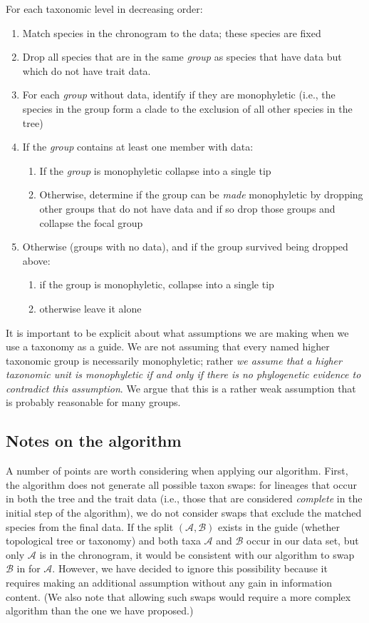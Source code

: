 \documentclass[a4paper,11pt]{article}
\begin{document}
For each taxonomic level in decreasing order:
\begin{enumerate}
  \item Match species in the chronogram to the data; these species are fixed
  \item Drop all species that are in the same \emph{group} as species that have data but which do not have trait data.
  \item For each \emph{group} without data, identify if they are monophyletic (i.e., the species in the group form a clade to the exclusion of all other species in the tree)
  \item If the \emph{group} contains at least one member with data:
    \begin{enumerate}
    \item If the \emph{group} is monophyletic collapse into a single tip
    \item Otherwise, determine if the group can be \emph{made} monophyletic by dropping other groups that do not have data and if so drop those groups and collapse the focal group
    \end{enumerate}
  \item Otherwise (groups with no data), and if the group survived being dropped above:
    \begin{enumerate}
    \item if the group is monophyletic, collapse into a single tip
    \item otherwise leave it alone
    \end{enumerate}
\end{enumerate}

It is important to be explicit about what assumptions we are making when we use a taxonomy as a guide. We are not assuming that every named higher taxonomic group is necessarily monophyletic; rather \emph{we assume that a higher taxonomic unit is monophyletic if and only if there is no phylogenetic evidence to contradict this assumption}. We argue that this is a rather weak assumption that is probably reasonable for many groups.

\subsection{Notes on the algorithm}

A number of points are worth considering when applying our algorithm. First, the algorithm does not generate all possible taxon swaps: for lineages that occur in both the tree and the trait data (i.e., those that are considered \emph{complete} in the initial step of the algorithm), we do not consider swaps that exclude the matched species from the final data. If the split $(\mathcal{A,B})$ exists in the guide (whether topological tree or taxonomy) and both taxa $\mathcal{A}$ and $\mathcal{B}$ occur in our data set, but only $\mathcal{A}$ is in the chronogram, it would be consistent with our algorithm to swap $\mathcal{B}$ in for $\mathcal{A}$. However, we have decided to ignore this possibility because it requires making an additional assumption without any gain in information content. (We also note that allowing such swaps would require a more complex algorithm than the one we have proposed.) 
\end{document}
